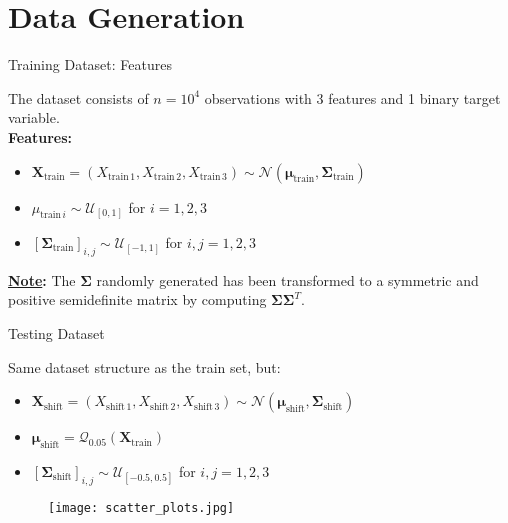 \section{Data Generation}

\begin{frame}{Training Dataset: Features}

    The dataset consists of $n = 10^4$ observations with 3 features and 1 binary target variable.\\\vspace{0.3cm}
    \textbf{Features:}
    \begin{itemize}
        \item $ \boldsymbol{X}_{\text{train}} = (X_{\text{train}\,1}, X_{\text{train}\,2}, X_{\text{train}\,3}) \sim \mathcal{N}(\boldsymbol{\mu}_{\text{train}}, \boldsymbol{\Sigma}_{\text{train}}) $
        \item $ \mu_{\text{train}\,i} \sim \mathcal{U}_{[0,1]} $ for $ i = 1, 2, 3 $
        \item $ [\boldsymbol{\Sigma}_{\text{train}}]_{i,j} \sim \mathcal{U}_{[-1,1]} $ for $ i, j = 1, 2, 3 $
    \end{itemize}
    \vspace{0.3cm}
    \textbf{\underline{Note}:} The $\boldsymbol{\Sigma}$ randomly generated has been transformed to a symmetric and positive semidefinite matrix by computing $\boldsymbol{\Sigma}\boldsymbol{\Sigma}^T$. 

\end{frame}

\begin{frame}{Testing Dataset}

    Same dataset structure as the train set, but:
    \begin{itemize}
        \item $ \boldsymbol{X}_{\text{shift}} = (X_{\text{shift}\,1}, X_{\text{shift}\,2}, X_{\text{shift}\,3}) \sim \mathcal{N}(\boldsymbol{\mu}_{\text{shift}}, \boldsymbol{\Sigma}_{\text{shift}}) $
        \item $ \boldsymbol{\mu}_{\text{shift}} = \mathcal{Q}_{0.05}(\boldsymbol{X}_{\text{train}})$
        \item $ [\boldsymbol{\Sigma}_{\text{shift}}]_{i,j} \sim \mathcal{U}_{[-0.5,0.5]} $ for $ i, j = 1, 2, 3 $
    \end{itemize}

    \begin{figure}
        \centering
        \texttt{[image: scatter\_plots.jpg]}
    \end{figure}
    
\end{frame}


